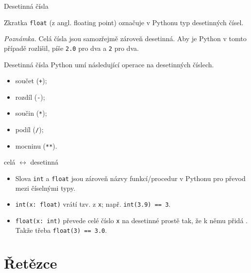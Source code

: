 \documentclass[aspectratio=169,11pt]{beamer}
\begin{document}
\begin{frame}{Desetinná čísla}
 \begin{tcolorbox}[title=Datový typ \texttt{float}]
  Zkratka \alert{\texttt{float}} (z angl. \alert{float}ing point) označuje v
  Pythonu typ desetinných čísel.
 \end{tcolorbox}
 \pause
 \emph{Poznámka.} Celá čísla jsou samozřejmě zároveň desetinná. Aby je Python v
 tomto případě rozlišil, píše \texttt{2.0} pro  dva a
 \texttt{2} pro  dva.
\end{frame}

\begin{frame}{Desetinná čísla}
 Python umí následující operace na desetinných číslech.
 \begin{itemize}
  \item součet (\texttt{+});
  \item rozdíl (\texttt{-});
  \item součin (\texttt{*});
  \item podíl (\texttt{/});
  \item mocninu (\texttt{**}).
 \end{itemize}
\end{frame}

\begin{frame}{celá $\leftrightarrow$ desetinná} 
 \begin{itemize}
  \item<1-> Slova \texttt{int} a \texttt{float} jsou zároveň názvy
   funkcí/procedur v Pythonu pro převod mezi číselnými typy.
  \item<2-> \texttt{\alert{int}(x: float)} vrátí tzv.  z
   \texttt{x}; např. \texttt{\alert{int}(3.9) == 3}.
  \item<3-> \texttt{\alert{float}(x: int)} převede celé číslo \texttt{x} na
   desetinné prostě tak, že k němu přidá . Takže třeba
   \texttt{\alert{float}(3) == 3.0}.
 \end{itemize}
\end{frame}

\section[Řetězce]{Řetězce}

\begin{frame}[plain]
 \sectionpage
\end{frame}
\end{document}
